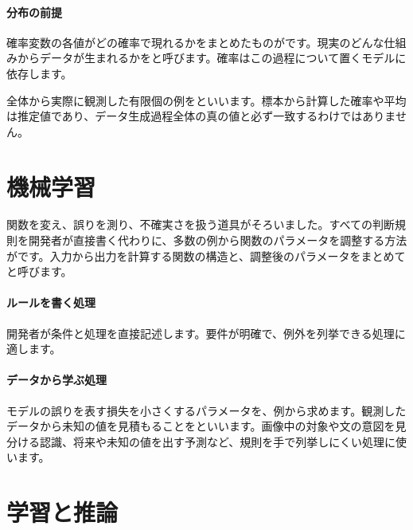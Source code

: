 \paragraph{分布の前提}
        確率変数の各値がどの確率で現れるかをまとめたものがです。現実のどんな仕組みからデータが生まれるかをと呼びます。確率はこの過程について置くモデルに依存します。

        全体から実際に観測した有限個の例をといいます。標本から計算した確率や平均は推定値であり、データ生成過程全体の真の値と必ず一致するわけではありません。

\par
\endgroup
\par
\endgroup


\section{機械学習}
\label{sec:06-machine-learning-04}

関数を変え、誤りを測り、不確実さを扱う道具がそろいました。すべての判断規則を開発者が直接書く代わりに、多数の例から関数のパラメータを調整する方法がです。入力から出力を計算する関数の構造と、調整後のパラメータをまとめてと呼びます。

\begingroup
  \centering
  \vspace{5mm}
\begingroup
\paragraph{ルールを書く処理}
        開発者が条件と処理を直接記述します。要件が明確で、例外を列挙できる処理に適します。

\par
\endgroup
\medskip
\begingroup
\paragraph{データから学ぶ処理}
        モデルの誤りを表す損失を小さくするパラメータを、例から求めます。観測したデータから未知の値を見積もることをといいます。画像中の対象や文の意図を見分ける認識、将来や未知の値を出す予測など、規則を手で列挙しにくい処理に使います。

\par
\endgroup
\par
\endgroup


\section{学習と推論}
\label{sec:06-machine-learning-05}

